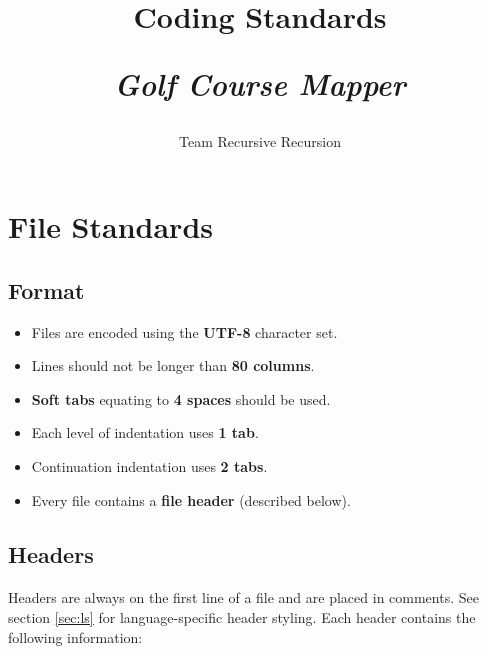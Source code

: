 \documentclass{article}
\title{
    Coding Standards\\
    \begin{large}
        \textit{Golf Course Mapper}
    \end{large}
}
\date{
    \begin{small}
        \today
    \end{small}
}
\author{
    Team Recursive Recursion
}
\begin{document}
    \maketitle
    \newpage


    \section{File Standards}
    \label{sec:fs}

    \subsection{Format}
    \label{sec:fs-format}

    \begin{itemize}
        \item Files are encoded using the \textbf{UTF-8} character set.
        \item Lines should not be longer than \textbf{80 columns}.
        \item \textbf{Soft tabs} equating to \textbf{4 spaces} should be used.
        \item Each level of indentation uses \textbf{1 tab}.
        \item Continuation indentation uses \textbf{2 tabs}.
        \item Every file contains a \textbf{file header} (described below).
    \end{itemize}

    \subsection{Headers}
    \label{sec:fs-headers}

    \paragraph{}
    Headers are always on the first line of a file and are placed in comments.
    See section \ref{sec:ls} for language-specific header styling. Each header
    contains the following information:
\end{document}
